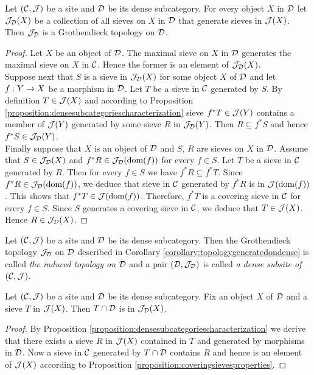 \begin{corollary}\label{corollary:topologygeneratedondense}
Let $({\mathcal C}, {\mathcal J})$ be a site and ${\mathcal D}$ be its dense subcategory. For every object $X$ in ${\mathcal D}$ let ${\mathcal J}_{{\mathcal D}}(X)$ be a collection of all sieves on $X$ in ${\mathcal D}$ that generate sieves in ${\mathcal J}(X)$. Then ${\mathcal J}_{{\mathcal D}}$ is a Grothendieck topology on ${\mathcal D}$.
\end{corollary}
\begin{proof}
Let $X$ be an object of ${\mathcal D}$. The maximal sieve on $X$ in ${\mathcal D}$ generates the maximal sieve on $X$ in ${\mathcal C}$. Hence the former is an element of ${\mathcal J}_{{\mathcal D}}(X)$.\\
Suppose next that $S$ is a sieve in ${\mathcal J}_{{\mathcal D}}(X)$ for some object $X$ of ${\mathcal D}$ and let $f:Y\rightarrow X$ be a morphism in ${\mathcal D}$. Let $T$ be a sieve in ${\mathcal C}$ generated by $S$. By definition $T\in {\mathcal J}(X)$ and according to Proposition \ref{proposition:densesubcategoriescharacterization} sieve $f^*T\in {\mathcal J}(Y)$ contains a member of ${\mathcal J}(Y)$ generated by some sieve $R$ in ${\mathcal J}_{{\mathcal D}}(Y)$. Then $R\subseteq f^*S$ and hence $f^*S \in {\mathcal J}_{{\mathcal D}}(Y)$.\\
Finally suppose that $X$ is an object of ${\mathcal D}$ and $S$, $R$ are sieves on $X$ in ${\mathcal D}$. Assume that $S\in {\mathcal J}_{{\mathcal D}}(X)$ and $f^*R\in {\mathcal J}_{{\mathcal D}}(\mathrm{dom}(f))$ for every $f\in S$. Let $T$ be a sieve in ${\mathcal C}$ generated by $R$. Then for every $f\in S$ we have $f^*R\subseteq f^*T$. Since $f^*R\in {\mathcal J}_{{\mathcal D}}(\mathrm{dom}(f))$, we deduce that sieve in ${\mathcal C}$ generated by $f^*R$ is in ${\mathcal J}(\mathrm{dom}(f))$. This shows that $f^*T \in {\mathcal J}(\mathrm{dom}(f))$. Therefore, $f^*T$ is a covering sieve in ${\mathcal C}$ for every $f\in S$. Since $S$ generates a covering sieve in ${\mathcal C}$, we deduce that $T\in {\mathcal J}(X)$. Hence $R \in {\mathcal J}_{{\mathcal D}}(X)$.
\end{proof}

\begin{definition}
Let $({\mathcal C},{\mathcal J})$ be a site and ${\mathcal D}$ be its dense subcategory. Then the Grothendieck topology ${\mathcal J}_{{\mathcal D}}$ on ${\mathcal D}$ described in Corollary \ref{corollary:topologygeneratedondense} is called \textit{the induced topology on ${\mathcal D}$} and a pair $({\mathcal D},{\mathcal J}_{{\mathcal D}})$ is called \textit{a dense subsite of $({\mathcal C},{\mathcal J})$}.
\end{definition}

\begin{corollary}\label{corollary:sievesondense}
Let $({\mathcal C},{\mathcal J})$ be a site and ${\mathcal D}$ be its dense subcategory. Fix an object $X$ of ${\mathcal D}$ and a sieve $T$ in ${\mathcal J}(X)$. Then $T\cap {\mathcal D}$ is in ${\mathcal J}_{{\mathcal D}}(X)$.
\end{corollary}
\begin{proof}
By Proposition \ref{proposition:densesubcategoriescharacterization} we derive that there exists a sieve $R$ in ${\mathcal J}(X)$ contained in $T$ and generated by morphisms in ${\mathcal D}$. Now a sieve in ${\mathcal C}$ generated by $T\cap {\mathcal D}$ contains $R$ and hence is an element of ${\mathcal J}(X)$ according to Proposition \ref{proposition:coveringsievesproperties}.
\end{proof}

